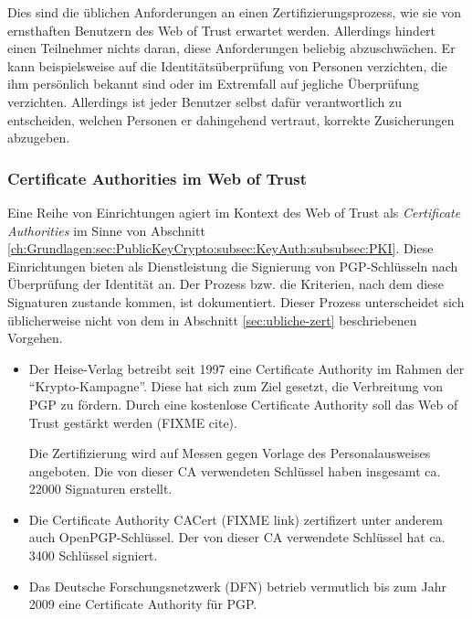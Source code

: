 Dies sind die \"ublichen Anforderungen an einen
Zertifizierungsprozess, wie sie von ernsthaften Benutzern des Web of
Trust erwartet werden. Allerdings hindert einen Teilnehmer nichts
daran, diese Anforderungen beliebig abzuschw\"achen. Er kann
beispielsweise auf die Identit\"ats\"uberpr\"ufung von Personen
verzichten, die ihm pers\"onlich bekannt sind oder im Extremfall auf
jegliche \"Uberpr\"ufung verzichten. Allerdings ist jeder Benutzer
selbst daf\"ur verantwortlich zu entscheiden, welchen Personen er
dahingehend vertraut, korrekte Zusicherungen abzugeben.

\subsubsection{Certificate Authorities im Web of Trust}
\label{sec:cert-auth-im}

Eine Reihe von Einrichtungen agiert im Kontext des Web of Trust als
\emph{Certificate Authorities} im Sinne von Abschnitt
\ref{ch:Grundlagen:sec:PublicKeyCrypto:subsec:KeyAuth:subsubsec:PKI}. Diese
Einrichtungen bieten als Dienstleistung die Signierung von
PGP-Schl\"usseln nach \"Uberpr\"ufung der Identit\"at an. Der Prozess
bzw. die Kriterien, nach dem diese Signaturen zustande kommen, ist
dokumentiert. Dieser Prozess unterscheidet sich \"ublicherweise nicht
von dem in Abschnitt \ref{sec:ubliche-zert} beschriebenen Vorgehen.

\begin{itemize}
\item Der Heise-Verlag betreibt seit 1997 eine Certificate Authority
  im Rahmen der ``Krypto-Kampagne''. Diese hat sich zum Ziel gesetzt,
  die Verbreitung von PGP zu f\"ordern. Durch eine kostenlose
  Certificate Authority soll das Web of Trust gest\"arkt werden (FIXME
  cite).

  Die Zertifizierung wird auf Messen gegen Vorlage des
  Personalausweises angeboten. Die von dieser CA verwendeten
  Schl\"ussel haben insgesamt ca. 22000 Signaturen erstellt.
\item Die Certificate Authority CACert (FIXME link) zertifizert unter
  anderem auch OpenPGP-Schl\"ussel. Der von dieser CA verwendete
  Schl\"ussel hat ca. 3400 Schl\"ussel signiert.
\item Das Deutsche Forschungsnetzwerk (DFN) betrieb vermutlich bis zum
  Jahr 2009 eine Certificate Authority f\"ur PGP.
\end{itemize}

